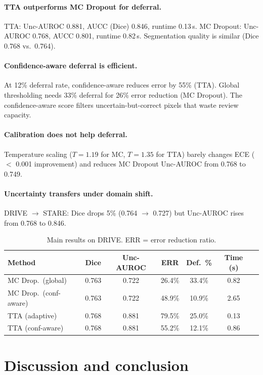\documentclass[runningheads]{llncs}
\begin{document}
\paragraph{TTA outperforms MC Dropout for deferral.} TTA: Unc-AUROC 0.881,
AUCC (Dice) 0.846, runtime 0.13\,s. MC Dropout: Unc-AUROC 0.768, AUCC 0.801,
runtime 0.82\,s. Segmentation quality is similar (Dice 0.768 vs.\ 0.764).

\paragraph{Confidence-aware deferral is efficient.} At 12\% deferral rate,
confidence-aware reduces error by 55\% (TTA). Global thresholding needs 33\%
deferral for 26\% error reduction (MC Dropout). The confidence-aware score
filters uncertain-but-correct pixels that waste review capacity.

\paragraph{Calibration does not help deferral.} Temperature scaling ($T = 1.19$
for MC, $T = 1.35$ for TTA) barely changes ECE ($<$ 0.001 improvement) and
reduces MC Dropout Unc-AUROC from 0.768 to 0.749.

\paragraph{Uncertainty transfers under domain shift.} DRIVE $\to$ STARE: Dice
drops 5\% (0.764 $\to$ 0.727) but Unc-AUROC rises from 0.768 to 0.846.

\begin{table}[t]
\centering
\caption{Main results on DRIVE. ERR = error reduction ratio.}
\small
\begin{tabular}{lcccccc}
\toprule
Method & Dice & Unc-AUROC & ERR & Def.\ \% & Time (s) \\
\midrule
MC Drop.\ (global) & 0.763 & 0.722 & 26.4\% & 33.4\% & 0.82 \\
MC Drop.\ (conf-aware) & 0.763 & 0.722 & 48.9\% & 10.9\% & 2.65 \\
TTA (adaptive) & 0.768 & 0.881 & 79.5\% & 25.0\% & 0.13 \\
TTA (conf-aware) & 0.768 & 0.881 & 55.2\% & 12.1\% & 0.86 \\
\bottomrule
\end{tabular}
\label{tab:main}
\end{table}

\section{Discussion and conclusion}
\end{document}
